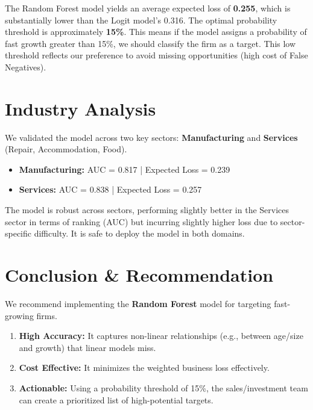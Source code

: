 \documentclass[11pt,a4paper]{article}
\begin{document}
The Random Forest model yields an average expected loss of \textbf{0.255}, which is substantially lower than the Logit model's 0.316. The optimal probability threshold is approximately \textbf{15\%}. This means if the model assigns a probability of fast growth greater than 15\%, we should classify the firm as a target. This low threshold reflects our preference to avoid missing opportunities (high cost of False Negatives).

\section*{Industry Analysis}

We validated the model across two key sectors: \textbf{Manufacturing} and \textbf{Services} (Repair, Accommodation, Food).

\begin{itemize}
    \item \textbf{Manufacturing:} AUC = 0.817 | Expected Loss = 0.239
    \item \textbf{Services:} AUC = 0.838 | Expected Loss = 0.257
\end{itemize}

The model is robust across sectors, performing slightly better in the Services sector in terms of ranking (AUC) but incurring slightly higher loss due to sector-specific difficulty. It is safe to deploy the model in both domains.

\section*{Conclusion \& Recommendation}

We recommend implementing the \textbf{Random Forest} model for targeting fast-growing firms. 
\begin{enumerate}
    \item \textbf{High Accuracy:} It captures non-linear relationships (e.g., between age/size and growth) that linear models miss.
    \item \textbf{Cost Effective:} It minimizes the weighted business loss effectively.
    \item \textbf{Actionable:} Using a probability threshold of 15\%, the sales/investment team can create a prioritized list of high-potential targets.
\end{enumerate}
\end{document}
